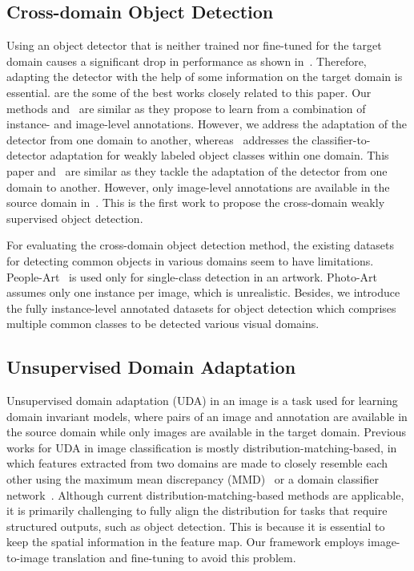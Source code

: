 \documentclass[10pt,twocolumn,letterpaper]{article}
\begin{document}
\subsection{Cross-domain Object Detection}
Using an object detector that is neither trained nor fine-tuned for the target domain causes a significant drop in performance as shown in~\cite{wilber2017bam}.
Therefore, adapting the detector with the help of some information on the target domain is essential. 
\cite{hoffman2015detector,chen2015webly} are the some of the best works closely related to this paper.
Our methods and~\cite{hoffman2015detector} are similar as they propose to learn from a combination of instance- and image-level annotations.
However, we address the adaptation of the detector from one domain to another, whereas~\cite{hoffman2015detector} addresses the classifier-to-detector adaptation for weakly labeled object classes within one domain.
This paper and~\cite{chen2015webly} are similar as they tackle the adaptation of the detector from one domain to another.
However, only image-level annotations are available in the source domain in~\cite{chen2015webly}.
This is the first work to propose the cross-domain weakly supervised object detection.


For evaluating the cross-domain object detection method, the existing datasets for detecting common objects in various domains seem to have limitations.
People-Art~\cite{westlake2016detecting} is used only for single-class detection in an artwork.
Photo-Art~\cite{wu2014learning} assumes only one instance per image, which is unrealistic.
Besides, we introduce the fully instance-level annotated datasets for object detection which comprises multiple common classes to be detected various visual domains.

\subsection{Unsupervised Domain Adaptation}
Unsupervised domain adaptation (UDA) in an image is a task used for learning domain invariant models, where pairs of an image and annotation are available in the source domain while only images are available in the target domain.
Previous works for UDA in image classification is mostly distribution-matching-based, in which features extracted from two domains are made to closely resemble each other using the maximum mean discrepancy (MMD)~\cite{gretton2012kernel} or a domain classifier network~\cite{long2015learning,ganin2016domain,long2016unsupervised,tzeng2017adversarial}.
Although current distribution-matching-based methods are applicable, it is primarily challenging to fully align the distribution for tasks that require structured outputs, such as object detection.
This is because it is essential to keep the spatial information in the feature map.
Our framework employs image-to-image translation and fine-tuning to avoid this problem.
\end{document}
